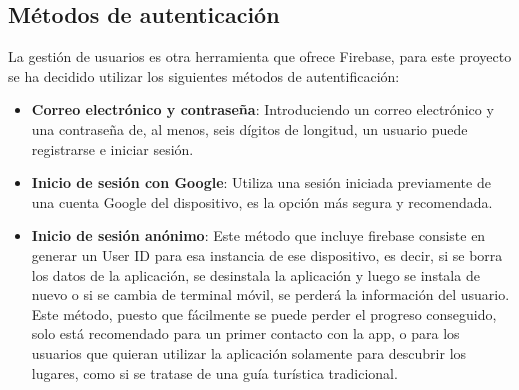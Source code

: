 \subsection{Métodos de autenticación}
La gestión de usuarios es otra herramienta que ofrece Firebase, para este proyecto se ha decidido utilizar los siguientes métodos de autentificación:
\begin{itemize}
\item \textbf{Correo electrónico y contraseña}: Introduciendo un correo electrónico y una contraseña de, al menos, seis dígitos de longitud, un usuario puede registrarse e iniciar sesión.
\item \textbf{Inicio de sesión con Google}: Utiliza una sesión iniciada previamente de una cuenta Google del dispositivo, es la opción más segura y recomendada.
\item \textbf{Inicio de sesión anónimo}: Este método que incluye firebase consiste en generar un User ID para esa instancia de ese dispositivo, es decir, si se borra los datos de la aplicación, se desinstala la aplicación y luego se instala de nuevo o si se cambia de terminal móvil, se perderá la información del usuario. Este método, puesto que fácilmente se puede perder el progreso conseguido, solo está recomendado para un primer contacto con la app, o para los usuarios que quieran utilizar la aplicación solamente para descubrir los lugares, como si se tratase de una guía turística tradicional.
\end{itemize}
